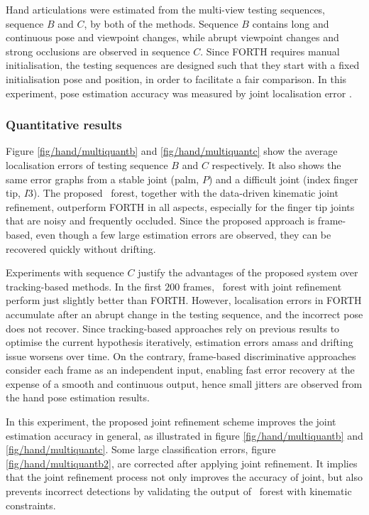 Hand articulations were estimated from the multi-view testing sequences, \ie sequence $B$ and $C$, by both of the methods. 
Sequence $B$ contains long and continuous pose and viewpoint changes, while abrupt viewpoint changes and strong occlusions are observed in sequence $C$.  
Since FORTH requires manual initialisation, the testing sequences are designed such that they start with a fixed initialisation pose and position, in order to facilitate a fair comparison.   
In this experiment, pose estimation accuracy was measured by joint localisation error \cite{Oikonomidis2011}.

\subsubsection{Quantitative results}

Figure \ref{fig/hand/multiquantb} and \ref{fig/hand/multiquantc} show the average localisation errors of testing sequence $B$ and $C$ respectively. It also shows the same error graphs from a stable joint (palm, $P$) and a difficult joint (index finger tip, $I3$). The proposed \STR\ forest, together with the data-driven kinematic joint refinement, outperform FORTH in all aspects, especially for the finger tip joints that are noisy and frequently occluded. Since the proposed approach is frame-based, even though a few large estimation errors are observed, they can be recovered quickly without drifting.    

Experiments with sequence $C$ justify the advantages of the proposed system over tracking-based methods. In the first $200$ frames, \STR\ forest with joint refinement perform just slightly better than FORTH. However, localisation errors in FORTH accumulate after an abrupt change in the testing sequence, and the incorrect pose does not recover.
Since tracking-based approaches rely on previous results to optimise the current hypothesis iteratively, estimation errors amass and drifting issue worsens over time. On the contrary, frame-based discriminative approaches consider each frame as an independent input, enabling fast error recovery at the expense of a smooth and continuous output, hence small jitters are observed from the hand pose estimation results.  

In this experiment, the proposed joint refinement scheme improves the joint estimation accuracy in general, as illustrated in figure \ref{fig/hand/multiquantb} and \ref{fig/hand/multiquantc}. 
Some large classification errors, \eg figure \ref{fig/hand/multiquantb2}, are corrected after applying joint refinement. It implies that the joint refinement process not only improves the accuracy of joint, but also prevents incorrect detections by validating the output of \STR\ forest with kinematic constraints.

